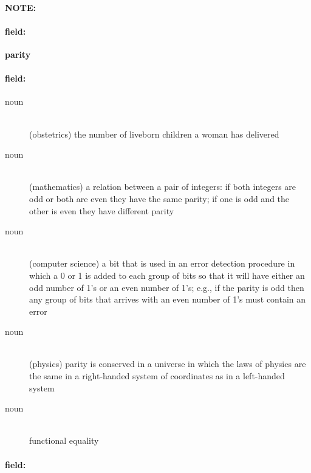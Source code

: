 \documentclass[12pt]{article}
\newenvironment{note}{\paragraph{NOTE:}}{}
\newenvironment{field}{\paragraph{field:}}{}
\begin{document}
\begin{note}
\begin{field}
\textbf{\large parity}
\end{field}


\begin{field}
\begin{description}
\item[noun] \hfill \\ 
(obstetrics) the number of liveborn children a woman has delivered

\item[noun] \hfill \\ 
(mathematics) a relation between a pair of integers: if both integers are odd or both are even they have the same parity; if one is odd and the other is even they have different parity

\item[noun] \hfill \\ 
(computer science) a bit that is used in an error detection procedure in which a 0 or 1 is added to each group of bits so that it will have either an odd number of 1's or an even number of 1's; e.g., if the parity is odd then any group of bits that arrives with an even number of 1's must contain an error

\item[noun] \hfill \\ 
(physics) parity is conserved in a universe in which the laws of physics are the same in a right-handed system of coordinates as in a left-handed system

\item[noun] \hfill \\ 
functional equality

\end{description}
\end{field}

\begin{field}
\end{field}
\end{note}
\end{document}

